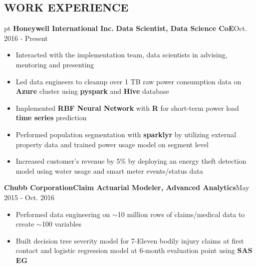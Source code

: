 \documentclass[10.5pt]{res} %
\begin{document}
\begin{resume}
\section{WORK EXPERIENCE}  pt
	\textbf{Honeywell International Inc.} \quad\quad\textbf{Data Scientist, Data Science CoE}\hfill Oct. 2016 - Present
		\begin{itemize}
			\item Interacted with the implementation team, data scientists in advising, mentoring and presenting
			\item Led data engineers to cleanup over 1 TB raw power consumption data  on \textbf{Azure} cluster using \textbf{pyspark} and \textbf{Hive} database  
			\item Implemented \textbf{RBF Neural Network} with \textbf{R} for short-term power load \textbf{time series} prediction     
			\item Performed population segmentation with \textbf{sparklyr} by utilizing external property data and trained power usage model on segment level
			\item Increased customer's revenue by 5\%  by deploying an energy theft detection model using water usage and smart meter events/status data  
		\end{itemize}\vspace{-\topsep}
	\textbf{Chubb Corporation}\quad \textbf{Claim Actuarial Modeler, Advanced Analytics}\hfill May 2015 - Oct. 2016
		\begin{itemize}  pt
			\item Performed data engineering on $\sim$10 million rows of claims/medical data to create $\sim$100 variables 
			\item Built {decision tree} severity model for 7-Eleven bodily injury claims at first contact and {logistic regression} model at 6-month evaluation point using \textbf{SAS EG} %

\end{itemize}
\end{resume}
\end{document}
